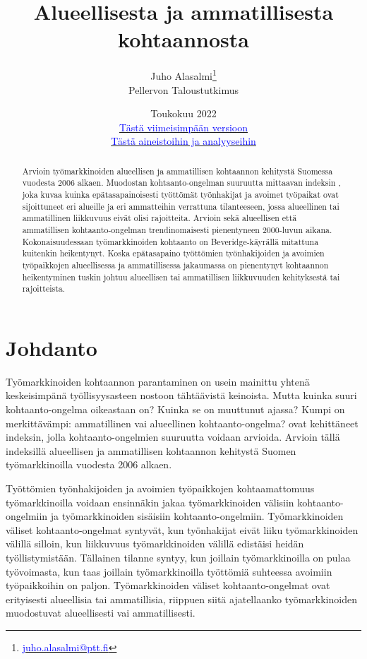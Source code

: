 \documentclass[12pt]{article}
\title{Alueellisesta ja ammatillisesta kohtaannosta}
\date{Toukokuu 2022 \\ 
\href{https://github.com/pttry/kohtaantoindeksit/blob/main/text/kohtaantoindeksit.pdf}{\textcolor{blue}{Tästä viimeisimpään versioon}} \\
\href{https://github.com/pttry/kohtaantoindeksit}{\textcolor{blue}{Tästä aineistoihin ja analyyseihin}}}
\author{Juho Alasalmi\footnote{\href{mailto: juho.alasalmi@ptt.fi}{\textcolor{blue}{juho.alasalmi@ptt.fi}}} \\ 
Pellervon Taloustutkimus }
\begin{document}
\maketitle

\begin{abstract}
Arvioin työmarkkinoiden alueellisen ja ammatillisen kohtaannon kehitystä Suomessa vuodesta 2006 alkaen. Muodostan kohtaanto-ongelman suuruutta mittaavan indeksin \cite{csahin2014mismatch}, joka kuvaa kuinka epätasapainoisesti työttömät työnhakijat ja avoimet työpaikat ovat sijoittuneet eri alueille ja eri ammatteihin verrattuna tilanteeseen, jossa alueellinen tai ammatillinen liikkuvuus eivät olisi rajoitteita. Arvioin sekä alueellisen että ammatillisen kohtaanto-ongelman trendinomaisesti pienentyneen 2000-luvun aikana. Kokonaisuudessaan työmarkkinoiden kohtaanto on Beveridge-käyrällä mitattuna kuitenkin heikentynyt. Koska epätasapaino työttömien työnhakijoiden ja avoimien työpaikkojen alueellisessa ja ammatillisessa jakaumassa on pienentynyt kohtaannon heikentyminen tuskin johtuu alueellisen tai ammatillisen liikkuvuuden kehityksestä tai rajoitteista.
\end{abstract}



\section{Johdanto} \label{section:johdanto}

Työmarkkinoiden kohtaannon parantaminen on usein mainittu yhtenä keskeisimpänä työllisyysasteen nostoon tähtäävistä keinoista. Mutta kuinka suuri kohtaanto-ongelma oikeastaan on? Kuinka se on muuttunut ajassa? Kumpi on merkittävämpi: ammatillinen vai alueellinen kohtaanto-ongelma?  ovat kehittäneet indeksin, jolla kohtaanto-ongelmien suuruutta voidaan arvioida. Arvioin tällä indeksillä  alueellisen ja ammatillisen kohtaannon kehitystä Suomen työmarkkinoilla vuodesta 2006 alkaen.

Työttömien työnhakijoiden ja avoimien työpaikkojen kohtaamattomuus työmarkkinoilla voidaan ensinnäkin jakaa työmarkkinoiden välisiin kohtaanto-ongelmiin ja työmarkkinoiden sisäisiin kohtaanto-ongelmiin. Työmarkkinoiden väliset kohtaanto-ongelmat syntyvät, kun työnhakijat eivät liiku työmarkkinoiden välillä silloin, kun liikkuvuus työmarkkinoiden välillä edistäisi heidän työllistymistään. Tällainen tilanne syntyy, kun joillain työmarkkinoilla on pulaa työvoimasta, kun taas joillain työmarkkinoilla työttömiä suhteessa avoimiin työpaikkoihin on paljon. Työmarkkinoiden väliset kohtaanto-ongelmat ovat erityisesti alueellisia tai ammatillisia, riippuen siitä ajatellaanko työmarkkinoiden muodostuvat alueellisesti vai ammatillisesti.
\end{document}
